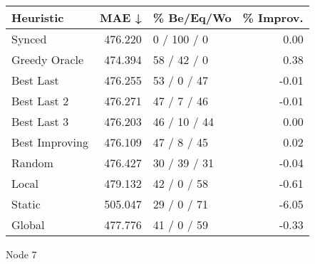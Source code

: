 \begin{tabular}{lrlr}
\toprule
\textbf{Heuristic} & \textbf{MAE ↓} & \textbf{\% Be/Eq/Wo} & \textbf{\% Improv.} \\
\midrule
            Synced &        476.220 &          0 / 100 / 0 &                0.00 \\
     Greedy Oracle &        474.394 &          58 / 42 / 0 &                0.38 \\
         Best Last &        476.255 &          53 / 0 / 47 &               -0.01 \\
       Best Last 2 &        476.271 &          47 / 7 / 46 &               -0.01 \\
       Best Last 3 &        476.203 &         46 / 10 / 44 &                0.00 \\
    Best Improving &        476.109 &          47 / 8 / 45 &                0.02 \\
            Random &        476.427 &         30 / 39 / 31 &               -0.04 \\
             Local &        479.132 &          42 / 0 / 58 &               -0.61 \\
            Static &        505.047 &          29 / 0 / 71 &               -6.05 \\
            Global &        477.776 &          41 / 0 / 59 &               -0.33 \\
\bottomrule
\end{tabular}
\caption{Node 7}
\label{tab:non_lr01_le2_bs2_7}
